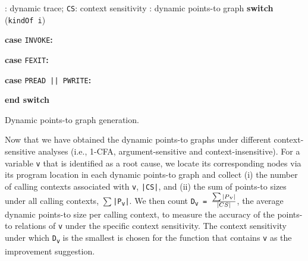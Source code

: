 \newcommand{\SWITCH}[1]{\STATE \textbf{switch} (#1) \begin{ALC@g}}
\newcommand{\ENDSWITCH}{\end{ALC@g} \STATE \textbf{end switch}}
\newcommand{\CASE}[1]{\STATE \textbf{case} #1\textbf{:} \begin{ALC@g}}
\newcommand{\ENDCASE}{\end{ALC@g}}
\newcommand{\CASELINE}[1]{\STATE \textbf{case} #1\textbf{:} \begin{ALC@g}}
\newcommand{\DEFAULT}{\STATE \textbf{default:} \begin{ALC@g}}
\newcommand{\ENDDEFAULT}{\end{ALC@g}}
\newcommand{\DEFAULTLINE}[1]{\STATE \textbf{default:} }

\begin{algorithm}[th!]
\begin{algorithmic}[1]
{
\renewcommand{\algorithmicrequire}{\textbf{Input:}}
\renewcommand{\algorithmicensure}{\textbf{Output:}}
: dynamic trace; {\tt CS}: context sensitivity
: dynamic points-to graph
\SWITCH {{\tt kindOf i}}
\CASE {{\tt INVOKE}}
 \ENDCASE
\CASELINE {{\tt FEXIT}}
 \ENDCASE
  \CASELINE {{\tt PREAD || PWRITE}}
\ENDIF
{}
 \ENDCASE
\ENDSWITCH
\ENDWHILE
}
\end{algorithmic}
\caption{Dynamic points-to graph generation.}
\label{alg:dyn-pts}
\end{algorithm}

Now that we have obtained the dynamic points-to graphs under different context-sensitive analyses (i.e., 1-CFA, argument-sensitive and context-insensitive). For a variable {\tt v} that is identified as a root cause, we locate its corresponding nodes via its program location in each dynamic points-to graph and collect (i) the number of calling contexts associated with {\tt v}, {\tt |CS|}, and (ii) the sum of points-to sizes under all calling contexts, {\tt $\sum$|P\textsubscript{v}|}. We then count {\tt D\textsubscript{v} = $\sum|P\textsubscript{v}|\over |CS|$}, the average dynamic points-to size per calling context, to measure the accuracy of the points-to relations of {\tt v} under the specific context sensitivity. The context sensitivity under which {\tt D\textsubscript{v}} is the smallest is chosen for the function that contains {\tt v} as the improvement suggestion.

